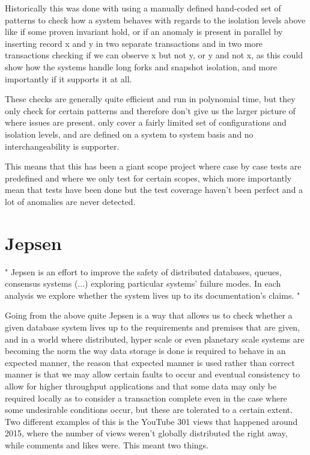 \documentclass[a4paper,10pt,titlepage]{report}
\begin{document}
    Historically this was done with using a manually defined hand-coded set of patterns to check how a system behaves with regards to the isolation levels above like if some proven invariant hold, or if an anomaly is present in parallel  by inserting record x and y in two separate transactions and in two more transactions checking if we can observe x but not y, or y and not x, as this could show how the systems handle long forks and snapshot isolation, and more importantly if it supports it at all.

    These checks are generally quite efficient and run in polynomial time, but they only check for certain patterns and therefore don't give us the larger picture of where issues are present.  only cover a fairly limited set of configurations and isolation levels, and are defined on a system to system basis and no interchangeability is supporter.

    This means that this has been a giant scope project where case by case tests are predefined and where we only test for certain scopes, which more importantly mean that tests have been done but the test coverage haven't been perfect and a lot of anomalies are never detected.



    \section{Jepsen}
    "
    Jepsen is an effort to improve the safety of distributed databases, queues, consensus systems  (...) exploring particular systems' failure modes. In each analysis we explore whether the system lives up to its documentation's claims.
    "\cite{jepsonio}
    \\
    \vspace{5mm}

    Going from the above quite Jepsen is a way that allows us to check whether a given database system lives up to the requirements and premises that are given, and in a world where distributed, hyper scale or even planetary scale systems are becoming the norm the way data storage is done is required to behave in an expected manner, the reason that expected manner is used rather than correct manner is that we may allow certain faults to occur and eventual consistency to allow for higher throughput applications and that some data may only be required locally as to consider a transaction complete even in the case where some undesirable conditions occur, but these are tolerated to a certain extent. \\
    \vspace{5mm}
    Two different examples of this is the YouTube 301 views that happened around 2015, where the number of views weren't globally distributed the right away, while comments and likes were. This meant two things. \\
\end{document}
